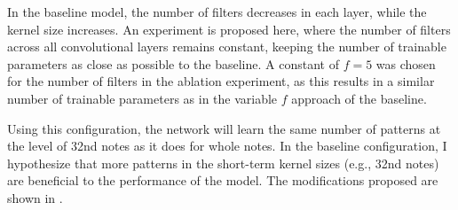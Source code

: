 
In the baseline model, the number of filters decreases in
each layer, while the kernel size increases. An experiment
is proposed here, where the number of filters across all
convolutional layers remains constant, keeping the number of
trainable parameters as close as possible to the baseline. A
constant of $f=5$ was chosen for the number of filters in
the ablation experiment, as this results in a similar number
of trainable parameters as in the variable $f$ approach of
the baseline.

Using this configuration, the network will learn the same
number of patterns at the level of \gls{32nd} notes as it
does for \gls{whole} notes. In the baseline configuration, I
hypothesize that more patterns in the short-term kernel
sizes (e.g., \gls{32nd} notes) are beneficial to the
performance of the model. The modifications proposed are
shown in .

